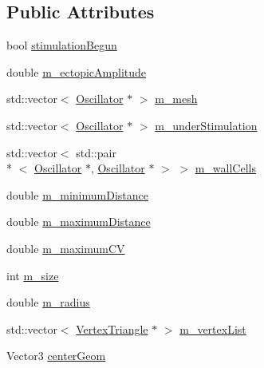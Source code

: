 \subsection*{Public Attributes}
\begin{DoxyCompactItemize}
\item 
bool \hyperlink{class_cardiac_mesh_ac14b1f228c8426e067df4a925824348e}{stimulation\+Begun}
\item 
double \hyperlink{class_cardiac_mesh_a4eeec3a9a09b9bc7e68ca3f7b34ea36c}{m\+\_\+ectopic\+Amplitude}
\item 
std\+::vector$<$ \hyperlink{class_oscillator}{Oscillator} $\ast$ $>$ \hyperlink{class_cardiac_mesh_acd49de8f8f878f45c927d4b75851ced6}{m\+\_\+mesh}
\item 
std\+::vector$<$ \hyperlink{class_oscillator}{Oscillator} $\ast$ $>$ \hyperlink{class_cardiac_mesh_a21749f0b4af8fe59552f97058982f695}{m\+\_\+under\+Stimulation}
\item 
std\+::vector$<$ std\+::pair\\*
$<$ \hyperlink{class_oscillator}{Oscillator} $\ast$, \hyperlink{class_oscillator}{Oscillator} $\ast$ $>$ $>$ \hyperlink{class_cardiac_mesh_a80e29d81b758c0294d673ae731f26343}{m\+\_\+wall\+Cells}
\item 
double \hyperlink{class_cardiac_mesh_a100654a6bb2237fc09cef29c517818ad}{m\+\_\+minimum\+Distance}
\item 
double \hyperlink{class_cardiac_mesh_a05ed4402cf331198ee5021c65ac37e23}{m\+\_\+maximum\+Distance}
\item 
double \hyperlink{class_cardiac_mesh_a48ee051becaeae6be8d4d1b1569645d2}{m\+\_\+maximum\+C\+V}
\item 
int \hyperlink{class_cardiac_mesh_aea33a4be0162859a292958757ac934fc}{m\+\_\+size}
\item 
double \hyperlink{class_cardiac_mesh_a4ebcb3d40ec7fbfea0b8f230a1677a00}{m\+\_\+radius}
\item 
std\+::vector$<$ \hyperlink{struct_vertex_triangle}{Vertex\+Triangle} $\ast$ $>$ \hyperlink{class_cardiac_mesh_a1961c25aa2da5493c0316d80c38cc088}{m\+\_\+vertex\+List}
\item 
Vector3 \hyperlink{class_cardiac_mesh_a671a783c6a63a79cc29e0b0baf8eda08}{center\+Geom}
\end{DoxyCompactItemize}


